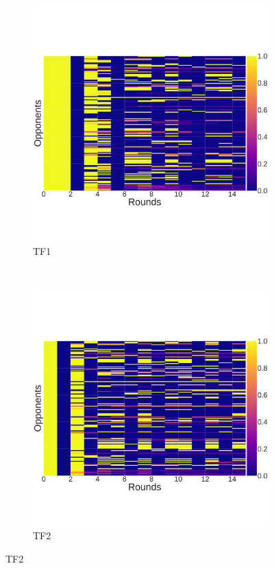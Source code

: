 \documentclass[10pt,letterpaper]{article}
\begin{document}
\begin{figure}[!hbtp]
    \centering
    \begin{subfigure}[t]{.5\columnwidth}
        \centering
        \includegraphics[width=\columnwidth]{./cooperation_0_0_10000_TF1_array.pdf}
        \caption{TF1}
    \end{subfigure}%
    ~
    \begin{subfigure}[t]{.5\columnwidth}
        \centering
        \includegraphics[width=\columnwidth]{./cooperation_0_0_10000_TF2_array.pdf}
        \caption{TF2}
    \end{subfigure}


\end{figure}
\end{document}
